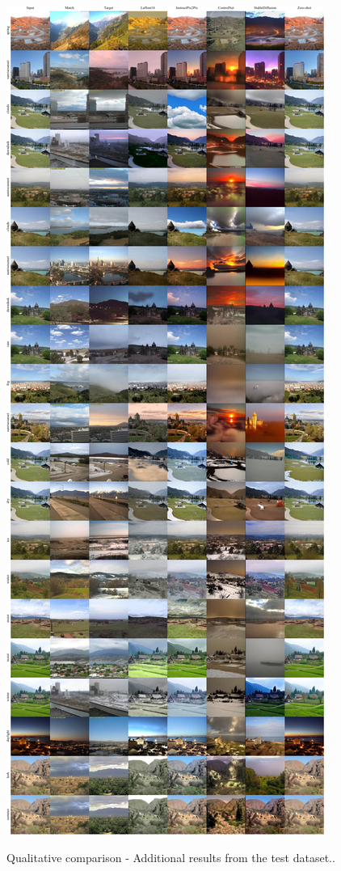 \begin{figure}[ht]
  \centering

  {\includegraphics[width=0.8\linewidth]{Chapters/appendix-figs/TAT-compressed.pdf}}

   \caption{Qualitative comparison - Additional results from the test dataset..}
   \label{fig:appendix-tat2}
\end{figure}

